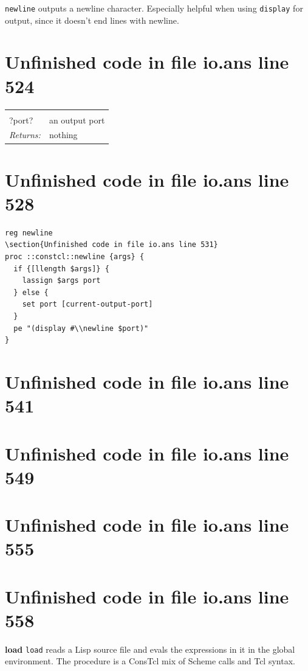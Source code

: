 \documentclass[twoside,9pt]{report}
\begin{document}
\texttt{newline} outputs a newline character. Especially helpful when using \texttt{display} for output, since it doesn't end lines with newline.

\section{Unfinished code in file io.ans line 524}
\noindent\begin{tabular}{ |p{1.9cm} p{8cm}| }
\hline
\rowcolor[HTML]{CCCCCC} \multicolumn{2}{|l|}{\bf newline (public)} \\
?port? & an output port \\
\textit{Returns:} & nothing \\
\hline
\end{tabular}
\section{Unfinished code in file io.ans line 528}
\begin{lstlisting}
reg newline
\section{Unfinished code in file io.ans line 531}
proc ::constcl::newline {args} {
  if {[llength $args]} {
    lassign $args port
  } else {
    set port [current-output-port]
  }
  pe "(display #\\newline $port)"
}
\end{lstlisting}
\section{Unfinished code in file io.ans line 541}
\section{Unfinished code in file io.ans line 549}
\section{Unfinished code in file io.ans line 555}

\section{Unfinished code in file io.ans line 558}

\textbf{load} \texttt{load} reads a Lisp source file and evals the expressions in it in the global environment. The procedure is a ConsTcl mix of Scheme calls and Tcl syntax.
\end{document}
